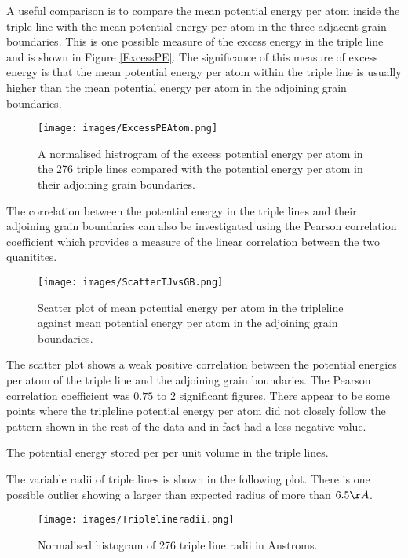 \documentclass[12pt,a4paper]{book}
\begin{document}
A useful comparison is to compare the mean potential energy per atom inside the triple line with the mean potential energy per atom in the three adjacent grain boundaries. This is one possible measure of the excess energy in the triple line and is shown in Figure \ref{ExcessPE}. The significance of this measure of excess energy is that the mean potential energy per atom within the triple line is usually higher than the mean potential energy per atom in the adjoining grain boundaries.

\begin{figure}[H]
	\texttt{[image: images/ExcessPEAtom.png]} 
	\label{fig:ExcessPE}
	\caption{A normalised histrogram of the excess potential energy per atom in the 276 triple lines compared with the potential energy per atom in their adjoining grain boundaries.}
\end{figure}

The correlation between the potential energy in the triple lines and their adjoining grain boundaries can also be investigated using the Pearson correlation coefficient which provides a measure of the linear correlation between the two quanitites.

\begin{figure}[H]
	\texttt{[image: images/ScatterTJvsGB.png]} 
	\label{fig:ScatterTJvsGB}
	\caption{Scatter plot of mean potential energy per atom in the tripleline against mean potential energy per atom in the adjoining grain boundaries.}
\end{figure}

The scatter plot shows a weak positive correlation between the potential energies per atom of the triple line and the adjoining grain boundaries. The Pearson correlation coefficient was $0.75$ to $2$ significant figures. There appear to be some points where the tripleline potential energy per atom did not closely follow the pattern shown in the rest of the data and in fact had a less negative value. 

The potential energy stored per per unit volume in the triple lines.

The variable radii of triple lines is shown in the following plot. There is one possible outlier showing a larger than expected radius of more than $6.5 \AA$. 

\begin{figure}
	\texttt{[image: images/Triplelineradii.png]}  
	\caption{Normalised histogram of 276 triple line radii in Anstroms.}	
	\label{fig:TJRadii}
\end{figure}	
\end{document}
